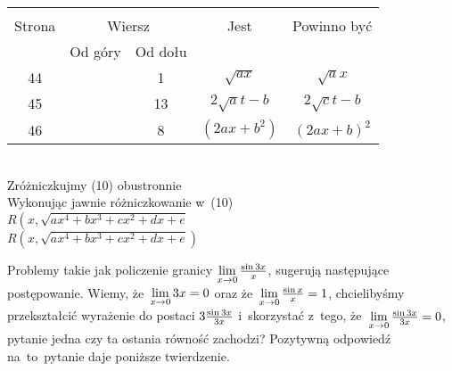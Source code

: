 \documentclass[a4paper,11pt]{article}
\begin{document}
\begin{center}
  \begin{tabular}{|c|c|c|c|c|}
    \hline
    & \multicolumn{2}{c|}{} & & \\
    Strona & \multicolumn{2}{c|}{Wiersz} & Jest
                              & Powinno być \\ \cline{2-3}
    & Od góry & Od dołu & & \\
    \hline
    44  & &  1 & $\sqrt{ ax }$ & $\sqrt{ a } x$ \\
    45  & & 13 & $2 \sqrt{ a } t - b$ & $2 \sqrt{ c } t - b$ \\
    46  & &  8 & $( 2 ax + b^{ 2 } )$ & $( 2 ax + b )^{ 2 }$ \\
    \hline
  \end{tabular}
\end{center}
\noi \\
 Zróżniczkujmy (10) obustronnie\ld \\
 Wykonując jawnie różniczkowanie w~(10)\ld \\
 \Jest
$R\left( x, \sqrt{ ax^{ 4 } + bx^{ 3 } + cx^{ 2 } + dx + e }
\right.$ \\
\Pow $R\left( x, \sqrt{ ax^{ 4 } + bx^{ 3 } + cx^{ 2 } + dx + e }
\right)$ \\

\vspace{\spaceTwo}








\start {} Problemy takie jak policzenie granicy
$\lim\limits_{ x \to 0 } \frac{ \sin 3 x }{ x }$, sugerują następujące
postępowanie. Wiemy, że~$\lim\limits_{ x \to 0 } 3x = 0$ oraz
że~$\lim\limits_{ x \to 0 } \frac{ \sin x }{ x } = 1$, chcielibyśmy
przekształcić wyrażenie do postaci $3 \frac{ \sin 3x }{ 3x }$
i~skorzystać z~tego, że~$\lim\limits_{ x \to 0 } \frac{ \sin 3x }{ 3x } = 0$,
pytanie jedna czy ta ostania równość zachodzi? Pozytywną odpowiedź
na~to~pytanie daje poniższe twierdzenie.
\end{document}
